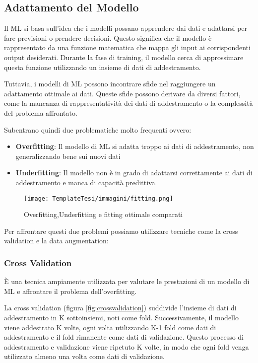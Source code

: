 \begin{flushleft}
\subsection{Adattamento del Modello}

Il ML si basa sull'idea che i modelli possano apprendere dai dati e adattarsi per fare previsioni o prendere decisioni. Questo significa che il modello è rappresentato da una funzione matematica che mappa gli input ai corrispondenti output desiderati. Durante la fase di training, il modello cerca di approssimare questa funzione utilizzando un insieme di dati di addestramento.

Tuttavia, i modelli di ML possono incontrare sfide nel raggiungere un adattamento ottimale ai dati. Queste sfide possono derivare da diversi fattori, come la mancanza di rappresentatività dei dati di addestramento o la complessità del problema affrontato.


Subentrano quindi due problematiche molto frequenti ovvero:
\begin{itemize}
    \item \textbf{Overfitting}: Il modello di ML si adatta troppo ai dati di addestramento, non generalizzando bene sui nuovi dati
    \item \textbf{Underfitting}: Il modello non è in grado di adattarsi correttamente ai dati di addestramento e manca di capacità predittiva
\end{itemize}  

\begin{figure}[H]
    \centering
    \texttt{[image: TemplateTesi/immagini/fitting.png]}
    \caption{Overfitting,Underfitting e fitting ottimale comparati \cite{ImmFittingComparazione}}
    \label{fig:fitting}
\end{figure}
Per affrontare questi due problemi possiamo utilizzare tecniche come la cross validation e la data augmentation:

\subsubsection{Cross Validation}
 È una tecnica ampiamente utilizzata per valutare le prestazioni di un modello di ML e affrontare il problema dell'overfitting. 
 
La cross validation (figura \ref{fig:crossvalidation}) suddivide l'insieme di dati di addestramento in K sottoinsiemi, noti come fold. Successivamente, il modello viene addestrato K volte, ogni volta utilizzando K-1 fold come dati di addestramento e il fold rimanente come dati di validazione. Questo processo di addestramento e validazione viene ripetuto K volte, in modo che ogni fold venga utilizzato almeno una volta come dati di validazione.


\end{flushleft}
